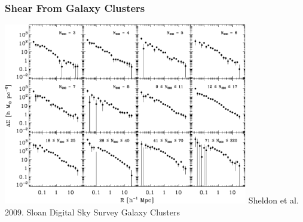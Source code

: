 \documentclass{beamer}
\begin{document}
\frame
{
    \frametitle{Shear From Galaxy Clusters}

    \begin{center}
        \includegraphics[width=0.8\textwidth]{maxbcg_sample21-22_ngals200_12_jackknife.pdf}
        \newline
        Sheldon et al. 2009.  Sloan Digital Sky Survey Galaxy Clusters
    \end{center}
}
\end{document}
